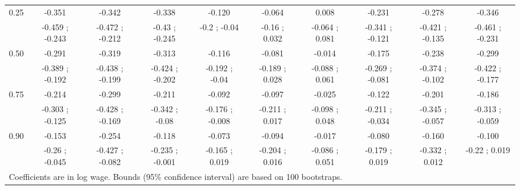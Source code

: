 \begin{table}[tb]
{\begin{tabular}{lccccccccc}
0.25 & -0.351 & -0.342 & -0.338 & -0.120 & -0.064 & 0.008 & -0.231 & -0.278 & -0.346\\
& -0.459 ; -0.243 & -0.472 ; -0.212 & -0.43 ; -0.245 & -0.2 ; -0.04 & -0.16 ; 0.032 & -0.064 ; 0.081 & -0.341 ; -0.121 & -0.421 ; -0.135 & -0.461 ; -0.231\\

0.50 & -0.291 & -0.319 & -0.313 & -0.116 & -0.081 & -0.014 & -0.175 & -0.238 & -0.299\\
& -0.389 ; -0.192 & -0.438 ; -0.199 & -0.424 ; -0.202 & -0.192 ; -0.04 & -0.189 ; 0.028 & -0.088 ; 0.061 & -0.269 ; -0.081 & -0.374 ; -0.102 & -0.422 ; -0.177\\

0.75 & -0.214 & -0.299 & -0.211 & -0.092 & -0.097 & -0.025 & -0.122 & -0.201 & -0.186\\
& -0.303 ; -0.125 & -0.428 ; -0.169 & -0.342 ; -0.08 & -0.176 ; -0.008 & -0.211 ; 0.017 & -0.098 ; 0.048 & -0.211 ; -0.034 & -0.345 ; -0.057 & -0.313 ; -0.059\\

0.90 & -0.153 & -0.254 & -0.118 & -0.073 & -0.094 & -0.017 & -0.080 & -0.160 & -0.100\\
& -0.26 ; -0.045 & -0.427 ; -0.082 & -0.235 ; -0.001 & -0.165 ; 0.019 & -0.204 ; 0.016 & -0.086 ; 0.051 & -0.179 ; 0.019 & -0.332 ; 0.012 & -0.22 ; 0.019\\
\midrule
\midrule
\multicolumn{10}{l}{\footnotesize{Coefficients are in log wage. Bounds (95\% confidence interval) are based on 100 bootstraps.}} \\
\end{tabular}}
\label{tab:unadjDecom}
\end{table}
